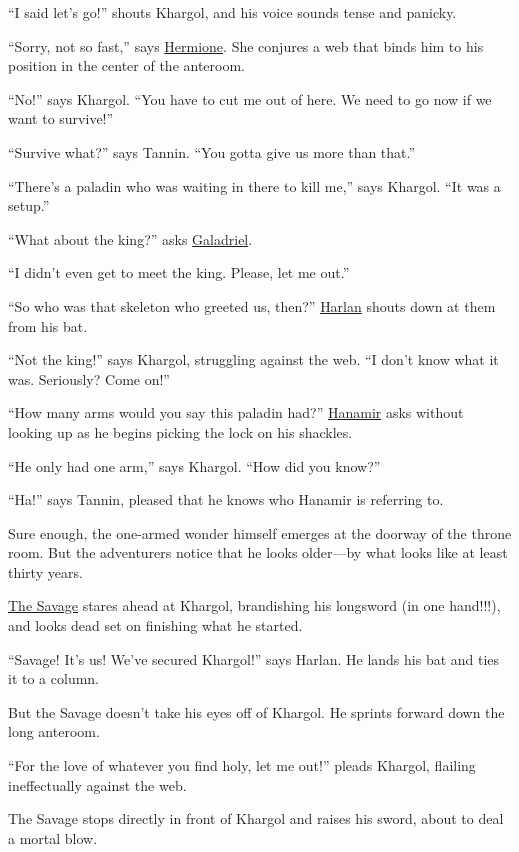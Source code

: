 \documentclass[smalldemyvopaper,11pt,twoside,onecolumn,openright,extrafontsizes]{memoir}
\begin{document}
``I said let's go!'' shouts Khargol, and his voice sounds tense and
panicky.

``Sorry, not so fast,'' says \href{/characters/hermione/}{Hermione}. She
conjures a web that binds him to his position in the center of the
anteroom.

``No!'' says Khargol. ``You have to cut me out of here. We need to go
now if we want to survive!''

``Survive what?'' says Tannin. ``You gotta give us more than that.''

``There's a paladin who was waiting in there to kill me,'' says Khargol.
``It was a setup.''

``What about the king?'' asks \href{/characters/galadriel/}{Galadriel}.

``I didn't even get to meet the king. Please, let me out.''

``So who was that skeleton who greeted us, then?''
\href{/characters/harlan/}{Harlan} shouts down at them from his bat.

``Not the king!'' says Khargol, struggling against the web. ``I don't
know what it was. Seriously? Come on!''

``How many arms would you say this paladin had?''
\href{/characters/hanamir/}{Hanamir} asks without looking up as he
begins picking the lock on his shackles.

``He only had one arm,'' says Khargol. ``How did you know?''

``Ha!'' says Tannin, pleased that he knows who Hanamir is referring to.

Sure enough, the one-armed wonder himself emerges at the doorway of the
throne room. But the adventurers notice that he looks older---by what
looks like at least thirty years.

\href{/characters/the-savage/}{The Savage} stares ahead at Khargol,
brandishing his longsword (in one hand!!!), and looks dead set on
finishing what he started.

``Savage! It's us! We've secured Khargol!'' says Harlan. He lands his
bat and ties it to a column.

But the Savage doesn't take his eyes off of Khargol. He sprints forward
down the long anteroom.

``For the love of whatever you find holy, let me out!'' pleads Khargol,
flailing ineffectually against the web.

The Savage stops directly in front of Khargol and raises his sword,
about to deal a mortal blow.
\end{document}
